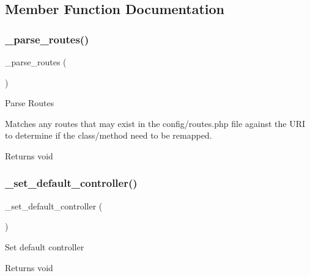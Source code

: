 \subsection{Member Function Documentation}
\mbox{\label{class_c_i___router_a55a42fae865d03334b49baa5a5a6bd0b}} 
\subsubsection{\texorpdfstring{\+\_\+parse\+\_\+routes()}{\_parse\_routes()}}
{\footnotesize\ttfamily \+\_\+parse\+\_\+routes (\begin{DoxyParamCaption}{ }\end{DoxyParamCaption})\hspace{0.3cm}{\ttfamily [protected]}}

Parse Routes

Matches any routes that may exist in the config/routes.\+php file against the U\+RI to determine if the class/method need to be remapped.

\begin{DoxyReturn}{Returns}
void 
\end{DoxyReturn}
\mbox{\label{class_c_i___router_a86b13067b062022251d2c7ecb4fb9492}} 
\subsubsection{\texorpdfstring{\+\_\+set\+\_\+default\+\_\+controller()}{\_set\_default\_controller()}}
{\footnotesize\ttfamily \+\_\+set\+\_\+default\+\_\+controller (\begin{DoxyParamCaption}{ }\end{DoxyParamCaption})\hspace{0.3cm}{\ttfamily [protected]}}

Set default controller

\begin{DoxyReturn}{Returns}
void 
\end{DoxyReturn}
\mbox{\label{class_c_i___router_a92b8b486926e4dea5fee4d71f80a472a}} 
